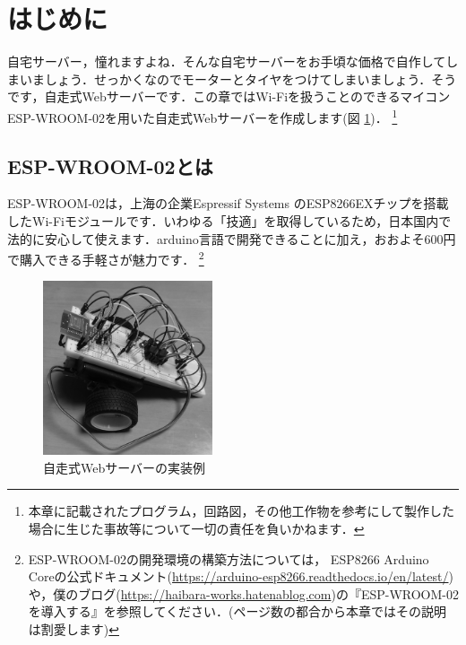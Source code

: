 \section{はじめに}
自宅サーバー，憧れますよね．そんな自宅サーバーをお手頃な価格で自作してしまいましょう．せっかくなのでモーターとタイヤをつけてしまいましょう．そうです，自走式Webサーバーです．この章ではWi-Fiを扱うことのできるマイコン ESP-WROOM-02を用いた自走式Webサーバーを作成します(図 \ref{fig:webserver})．
\footnote{本章に記載されたプログラム，回路図，その他工作物を参考にして製作した場合に生じた事故等について一切の責任を負いかねます．}
\subsection{ESP-WROOM-02とは}
ESP-WROOM-02は，上海の企業Espressif Systems のESP8266EXチップを搭載したWi-Fiモジュールです．いわゆる「技適」を取得しているため，日本国内で法的に安心して使えます．arduino言語で開発できることに加え，おおよそ600円で購入できる手軽さが魅力です．
\footnote{ESP-WROOM-02の開発環境の構築方法については， ESP8266 Arduino Coreの公式ドキュメント(\url{https://arduino-esp8266.readthedocs.io/en/latest/})や，僕のブログ(\url{https://haibara-works.hatenablog.com})の『ESP-WROOM-02を導入する』を参照してください．(ページ数の都合から本章ではその説明は割愛します)}

\begin{figure}[htbp]
    \centering
    \includegraphics[width=50mm]{./assets/sample-haibaraasset/webserver.jpg}
    \caption{自走式Webサーバーの実装例}
    \label{fig:webserver}
\end{figure}

